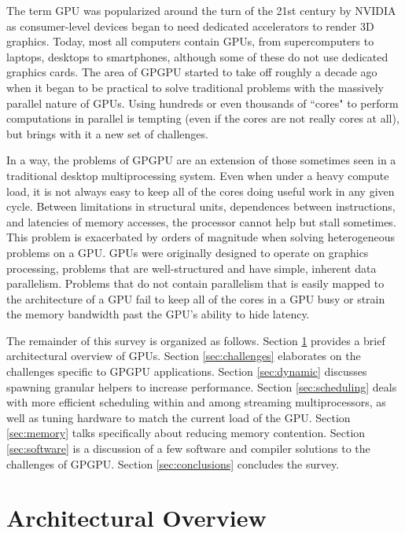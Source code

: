 \documentclass[prodmode,acmtecs]{acmsmall} %
\begin{document}
The term GPU was popularized around the turn of the 21st century by NVIDIA as
consumer-level devices began to need dedicated accelerators to render 3D
graphics. Today, most all computers contain GPUs, from supercomputers to
laptops, desktops to smartphones, although some of these do not use dedicated
graphics cards. The area of GPGPU started to take off roughly a decade ago when
it began to be practical to solve traditional problems with the massively
parallel nature of GPUs. Using hundreds or even thousands of ``cores" to perform
computations in parallel is tempting (even if the cores are not really cores at
all), but brings with it a new set of challenges.

In a way, the problems of GPGPU are an extension of those sometimes seen in a
traditional desktop multiprocessing system. Even when under a heavy compute
load, it is not always easy to keep all of the cores doing useful work in any
given cycle. Between limitations in structural units, dependences between
instructions, and latencies of memory accesses, the processor cannot help but
stall sometimes. This problem is exacerbated by orders of magnitude when solving
heterogeneous problems on a GPU. GPUs were originally designed to operate on
graphics processing, problems that are well-structured and have simple, inherent
data parallelism. Problems that do not contain parallelism that is easily mapped
to the architecture of a GPU fail to keep all of the cores in a GPU busy or
strain the memory bandwidth past the GPU's ability to hide latency.

The remainder of this survey is organized as follows. Section
\ref{sec:architecture} provides a brief architectural overview of GPUs. Section
\ref{sec:challenges} elaborates on the challenges specific to GPGPU
applications. Section \ref{sec:dynamic} discusses spawning granular helpers to
increase performance. Section \ref{sec:scheduling} deals with more efficient
scheduling within and among streaming multiprocessors, as well as tuning
hardware to match the current load of the GPU. Section \ref{sec:memory} talks
specifically about reducing memory contention. Section \ref{sec:software} is a
discussion of a few software and compiler solutions to the challenges of GPGPU.
Section
\ref{sec:conclusions} concludes the survey.

\section{Architectural Overview} \label{sec:architecture}
\end{document}
